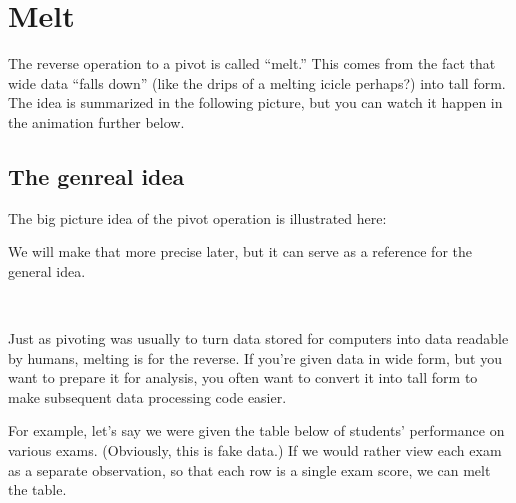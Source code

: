 \documentclass[letterpaper,10pt,english]{sphinxmanual}
\begin{document}
\section{Melt}
\label{\detokenize{chapter-6-single-table-verbs:melt}}
The reverse operation to a pivot is called “melt.”  This comes from the fact that wide data “falls down” (like the drips of a melting icicle perhaps?) into tall form.  The idea is summarized in the following picture, but you can watch it happen in the animation further below.


\subsection{The genreal idea}
\label{\detokenize{chapter-6-single-table-verbs:the-genreal-idea}}
The big picture idea of the pivot operation is illustrated here:


We will make that more precise later, but it can serve as a reference for the general idea.

 

Just as pivoting was usually to turn data stored for computers into data readable by humans, melting is for the reverse.  If you’re given data in wide form, but you want to prepare it for analysis, you often want to convert it into tall form to make subsequent data processing code easier.

For example, let’s say we were given the table below of students’ performance on various exams.  (Obviously, this is fake data.)  If we would rather view each exam as a separate observation, so that each row is a single exam score, we can melt the table.
\end{document}
